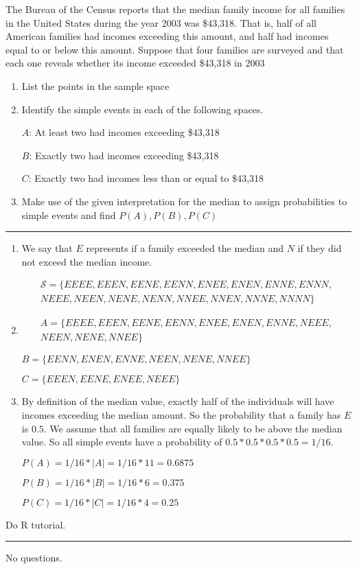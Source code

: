 \documentclass[11pt]{article}
\begin{document}
 
The Bureau of the Census reports that the median family income for all families in the United
States during the year 2003 was \$43,318. That is, half of all American families had incomes
exceeding this amount, and half had incomes equal to or below this amount. Suppose that four
families are surveyed and that each one reveals whether its income exceeded \$43,318 in 2003
\begin{enumerate}[\textbf{a}]
 	\item List the points in the sample space
 	\item Identify the simple events in each of the following spaces.
 	
 	
		\quad $A$: \quad At least two had incomes exceeding \$43,318 	
 	
 		\quad $B$: \quad Exactly two had incomes exceeding \$43,318
 	
 		\quad $C$: \quad Exactly two had incomes less than or equal to \$43,318
 	
 	\item Make use of the given interpretation for the median to assign probabilities to simple events and find $P(A), P(B), P(C)$  
\end{enumerate}
\hrule

\begin{enumerate}[a]

	\item We say that $E$ represents if a family exceeded the median and $N$ if they did not exceed the median income. 
	
	\begin{multline*}
	\mathcal{S} = \{EEEE, EEEN, EENE, EENN, ENEE, ENEN, ENNE, ENNN, \\ 
	NEEE, NEEN, NENE, NENN, NNEE, NNEN, NNNE, NNNN\}
	\end{multline*}
	
	
	
	
	\item
	
	\quad \begin{multline*}
	A = \{EEEE, EEEN, EENE, EENN, ENEE, ENEN, ENNE, NEEE,\\
	 NEEN, NENE, NNEE\}
	\end{multline*}	
	
	\quad $B = \{EENN, ENEN, ENNE, NEEN, NENE, NNEE\}$
	
	\quad $C = \{EEEN, EENE, ENEE, NEEE\}$
	
	
	\item By definition of the median value, exactly half of the individuals will have incomes exceeding the median amount. So the probability that a family has $E$ is $0.5$. We assume that all families are equally likely to be above the median value. So all simple events have a probability of $0.5 * 0.5 *0.5 * 0.5 = 1/16$.
	
	$P(A) = 1/16 * |A| = 1/16 * 11 = 0.6875$ 
	
	$P(B) = 1/16 * |B| = 1/16 * 6 = 0.375$ 
	
	$P(C) = 1/16 * |C| = 1/16 * 4 = 0.25$ 

\end{enumerate}


 Do R tutorial.
\hrule
No questions.
\end{document}
